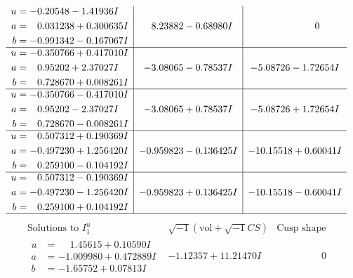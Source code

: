 \documentclass[1p]{elsarticle_modified}
\theoremstyle{definition}
\newcommand{\I}{\sqrt{-1}}
\begin{document}
$$\begin{array}{c|c|c}
\begin{aligned}
u &= -0.20548 - 1.41936 I \\
a &= \phantom{-}0.031238 + 0.300635 I \\
b &= -0.991342 - 0.167067 I\end{aligned}
 & \phantom{-}8.23882 - 0.68980 I & \phantom{-0.000000 } 0 \\ \hline\begin{aligned}
u &= -0.350766 + 0.417010 I \\
a &= \phantom{-}0.95202 + 2.37027 I \\
b &= \phantom{-}0.728670 + 0.008261 I\end{aligned}
 & -3.08065 - 0.78537 I & -5.08726 - 1.72654 I \\ \hline\begin{aligned}
u &= -0.350766 - 0.417010 I \\
a &= \phantom{-}0.95202 - 2.37027 I \\
b &= \phantom{-}0.728670 - 0.008261 I\end{aligned}
 & -3.08065 + 0.78537 I & -5.08726 + 1.72654 I \\ \hline\begin{aligned}
u &= \phantom{-}0.507312 + 0.190369 I \\
a &= -0.497230 + 1.256420 I \\
b &= \phantom{-}0.259100 - 0.104192 I\end{aligned}
 & -0.959823 - 0.136425 I & -10.15518 + 0.60041 I \\ \hline\begin{aligned}
u &= \phantom{-}0.507312 - 0.190369 I \\
a &= -0.497230 - 1.256420 I \\
b &= \phantom{-}0.259100 + 0.104192 I\end{aligned}
 & -0.959823 + 0.136425 I & -10.15518 - 0.60041 I\\
 \hline 
 \end{array}$$\newpage$$\begin{array}{c|c|c}  
\text{Solutions to }I^u_{1}& \I (\text{vol} + \sqrt{-1}CS) & \text{Cusp shape}\\
 \hline 
\begin{aligned}
u &= \phantom{-}1.45615 + 0.10590 I \\
a &= -1.009980 + 0.472889 I \\
b &= -1.65752 + 0.07813 I\end{aligned}
 & -1.12357 + 11.21470 I & \phantom{-0.000000 } 0 \\ \hline\begin{aligned}

\end{aligned}
\end{array}$$
\end{document}
